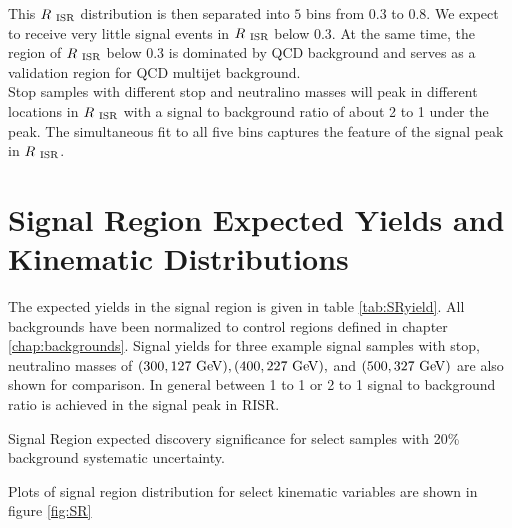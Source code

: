 \indent This $R_{~\mathrm{ISR}}$ distribution is then separated into $5$ bins from $0.3$ to $0.8$.  We expect to receive very little signal events in $R_{~\mathrm{ISR}}$ below 0.3.  At the same time, the region of $R_{~\mathrm{ISR}}$ below 0.3 is dominated by QCD background and serves as a validation region for QCD multijet background.  \\

\indent Stop samples with different stop and neutralino masses will peak in different locations in $R_{~\mathrm{ISR}}$ with a signal to background ratio of about 2 to 1 under the peak.  The simultaneous fit to all five bins captures the feature of the signal peak in $R_{~\mathrm{ISR}}$.  \\

\section{Signal Region Expected Yields and Kinematic Distributions}
\label{sec:SR:Yields}

\indent The expected yields in the signal region is given in table \ref{tab:SRyield}.  All backgrounds have been normalized to control regions defined in chapter \ref{chap:backgrounds}.  Signal yields for three example signal samples with stop, neutralino masses of $(300,127 \gev), (400,227\gev), $ and $(500,327 \gev)$ are also shown for comparison.  In general between 1 to 1 or 2 to 1 signal to background ratio is achieved in the signal peak in RISR. \\

\begin{table}
  \begin{center}
    \def\arraystretch{1.4}%
    
    
    
    
    
  \end{center}
  \caption{Signal Region expected discovery significance for select samples with 20\% background systematic uncertainty.}
  \label{tab:SRyield}
\end{table}

Plots of signal region distribution for select kinematic variables are shown in figure \ref{fig:SR}

